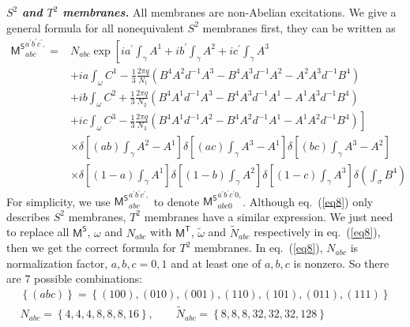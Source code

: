 \documentclass[11pt,nofootinbib,preprint]{revtex4-1}
\begin{document}
\textbf{\textit{$S^2$ and $T^2$ membranes.}}
All membranes are non-Abelian excitations. We give a general formula for all nonequivalent $S^2$ membranes first, they can be written as 
\begin{align}
	\mathsf{M^S}_{abc}^{a^{\prime}b^{\prime}c^{\prime},}=&N_{abc}\exp \left[ ia^{\prime}\int_{\gamma}{A^1}+ib^{\prime}\int_{\gamma}{A^2}+ic^{\prime}\int_{\gamma}{A^3} \right. \nonumber
	\\
	&+ia\int_{\omega}{C^1-\frac{1}{3}\frac{2\pi q}{N_1}\left( B^4A^2d^{-1}A^3-B^4A^3d^{-1}A^2-A^2A^3d^{-1}B^4 \right)} \nonumber
	\\
	&+ib\int_{\omega}{C^2+\frac{1}{3}\frac{2\pi q}{N_2}\left( B^4A^1d^{-1}A^3-B^4A^3d^{-1}A^1-A^1A^3d^{-1}B^4 \right)} \nonumber
	\\
	&+\left. ic\int_{\omega}{C^3-\frac{1}{3}\frac{2\pi q}{N_3}\left( B^4A^1d^{-1}A^2-B^4A^2d^{-1}A^1-A^1A^2d^{-1}B^4 \right)} \right]  \nonumber
	\\
	&\times \delta \left[ \left( ab \right) \int_{\gamma}{A^2-A^1} \right] \delta \left[ \left( ac \right) \int_{\gamma}{A^3-A^1} \right] \delta \left[ \left( bc \right) \int_{\gamma}{A^3-A^2} \right] \nonumber
	\\
	&\times \delta \left[ \left( 1-a \right) \int_{\gamma}{A^1} \right] \delta \left[ \left( 1-b \right) \int_{\gamma}{A^2} \right] \delta \left[ \left( 1-c \right) \int_{\gamma}{A^3} \right] \delta \left( \int_{\sigma}{B^4} \right) 	
	\label{eq8}
\end{align}
For simplicity, we use $\mathsf{M^S}_{abc}^{a^{\prime}b^{\prime}c^{\prime},}$ to denote $\mathsf{M^S}_{abc0}^{a^{\prime}b^{\prime}c^{\prime}0,}$. Although eq.~(\ref{eq8}) only describes $S^2$ membranes, $T^2$ membranes have a similar expression. We just need to replace all $\mathsf{M^S}$, $\omega$ and $N_{abc}$ with $\mathsf{M^T}$, $\tilde{\omega}$ and $\tilde{N}_{abc}$ respectively in eq.~(\ref{eq8}), then we get the correct formula for $T^2$ membranes. In eq.~(\ref{eq8}), $N_{abc}$ is normalization factor, $a,b,c=0,1$ and at least one of $a,b,c$ is nonzero. So there are $7$ possible combinations:
\begin{gather}
	\left\{ \left( abc \right) \right\} =\left\{ \left( 100 \right) ,\left( 010 \right) ,\left( 001 \right) ,\left( 110 \right) ,\left( 101 \right) ,\left( 011 \right) ,\left( 111 \right) \right\}
	\label{eq31-}  
	\\
	N_{abc}=\left\{4,4,4,8,8,8,16\right\},\qquad\tilde{N}_{abc}=\left\{8,8,8,32,32,32,128\right\}
	\label{eq31}
\end{gather}
\end{document}
